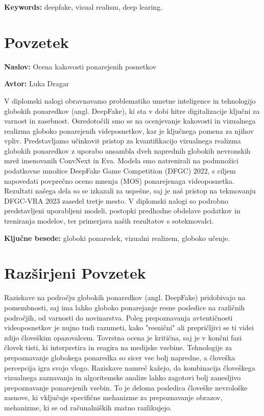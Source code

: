 \documentclass[a4paper,12pt,openright]{book}
\newcommand{\ttitle}{Ocena kakovosti ponarejenih posnetkov}
\newcommand{\tauthor}{Luka Dragar}
\newcommand{\tkeywords}{globoki ponaredek, vizualni realizem, globoko učenje}
\newcommand{\tkeywordsEn}{deepfake, visual realism, deep learing}
\newcommand{\clearemptydoublepage}{\newpage{\pagestyle{empty}\cleardoublepage}}
\begin{document}
\bigskip

\noindent\textbf{Keywords:} \tkeywordsEn.
\clearemptydoublepage

{}
\chapter*{Povzetek}

\noindent\textbf{Naslov:} \ttitle
\bigskip

\noindent\textbf{Avtor:} \tauthor
\bigskip

\noindent V diplomski nalogi obravnavamo problematiko umetne inteligence in tehno\-logijo globokih ponaredkov (angl. DeepFake), ki sta v dobi hitre digitalizacije ključni za varnost in zasebnost. Osredotočili smo se na ocenjevanje kakovosti in vizualnega realizma globoko ponarejenih videposnetkov, kar je ključnega pomena za njihov vpliv. Predstavljamo učinkovit pristop za kvantifikacijo vizualnega realizma globokih ponaredkov z uporabo ansambla dveh naprednih globokih nevronskih mrež imenovanih ConvNext in Eva. Modela smo natrenirali na podmnožici podatkovne množice DeepFake Game Competition (DFGC) 2022, s ciljem napovedati povprečno oceno mnenja (MOS) ponarejenaga videoposnetka. Rezultati našega dela so se izkazali za uspešne, saj je naš pristop na tekmovanju DFGC-VRA 2023 zasedel tretje mesto. V diplomski nalogi so podrobno predstavljeni uporabljeni modeli, postopki predhodne obdelave podatkov in treniranja modelov, ter primerjava naših rezultatov s sotekmovalci.

\bigskip

\noindent\textbf{Ključne besede:} \tkeywords.
\clearemptydoublepage


{}
\chapter*{Razširjeni Povzetek}
Raziskave na področju globokih ponaredkov (angl. DeepFake) pridobivajo na pomembnosti, saj ima lahko globoko ponarejanje resne posledice na različnih področjih, od varnosti do novinarstva. Poleg prepoznavanja avtentičnosti videoposnetkov je nujno tudi razumeti, kako "resnični" ali prepričljivi se ti videi zdijo človeškim opazovalcem. Tovrstna ocena je kritična, saj je v končni fazi človek tisti, ki interpretira in reagira na medijske vsebine. Tehnologije za prepoznavanje globokega ponaredka so sicer vse bolj napredne, a človeška percepcija igra svojo vlogo. Raziskave namreč kažejo, da kombinacija človeškega vizualnega zaznavanja in algoritemske analize lahko zagotovi bolj zanesljivo prepoznavanje ponarejenih vsebin. To je deloma posledica človeške nevrološke zasnove, ki vključuje specifične mehanizme za prepoznavanje obrazov, mehanizme, ki se od računalniških znatno razlikujejo. 
\end{document}
